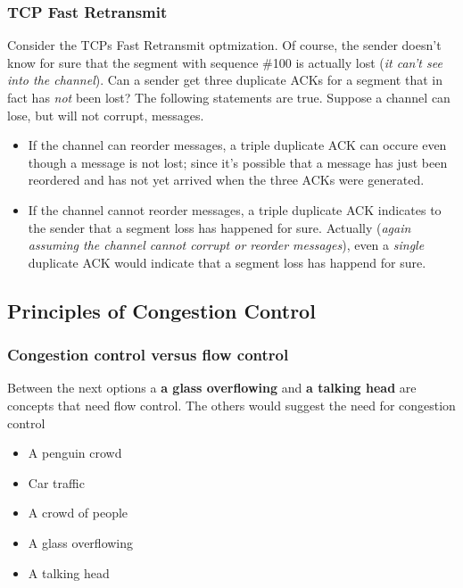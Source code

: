     \subsubsection*{TCP Fast Retransmit}
    \noindent Consider the TCPs Fast Retransmit optmization. Of course, the sender doesn't know for sure that the segment with sequence \#100 is actually lost (\textit{it can't see into the channel}).
    Can a sender get three duplicate ACKs for a segment that in fact has \textit{not} been lost? The following statements are true. Suppose a channel can lose, but will not corrupt, messages.
    \begin{itemize}
        \item If the channel can reorder messages, a triple duplicate ACK can occure even though a message is not lost; since it's possible that a message has just been reordered and has not
        yet arrived when the three ACKs were generated.
        \item If the channel cannot reorder messages, a triple duplicate ACK indicates to the sender that a segment loss has happened for sure. Actually (\textit{again assuming the channel cannot
        corrupt or reorder messages}), even a \textit{single} duplicate ACK would indicate that a segment loss has happend for sure.
    \end{itemize}

\subsection*{Principles of Congestion Control}
    \subsubsection*{Congestion control versus flow control}
    \noindent Between the next options a \textbf{a glass overflowing} and \textbf{a talking head} are concepts that need flow control. The others would suggest the need for congestion control
    \begin{itemize}
        \item A penguin crowd
        \item Car traffic
        \item A crowd of people
        \item A glass overflowing
        \item A talking head
    \end{itemize}


